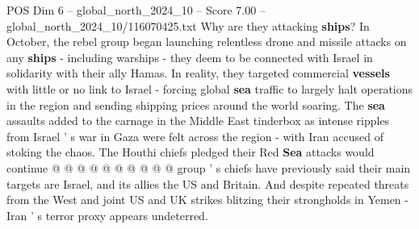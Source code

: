 \begin{textsample}{POS Dim 6 – global\_north\_2024\_10 – Score 7.00 – global\_north\_2024\_10/116070425.txt}
Why are they attacking \textbf{ships}?
In October, the rebel group began launching relentless drone and missile attacks on any \textbf{ships} - including warships - they deem to be connected with Israel in solidarity with their ally Hamas.
In reality, they targeted commercial \textbf{vessels} with little or no link to Israel - forcing global \textbf{sea} traffic to largely halt operations in the region and sending shipping prices around the world soaring.
The \textbf{sea} assaults added to the carnage in the Middle East tinderbox as intense ripples from Israel ' s war in Gaza were felt across the region - with Iran accused of stoking the chaos.
The Houthi chiefs pledged their Red \textbf{Sea} attacks would continue @ @ @ @ @ @ @ @ @ @ group ' s chiefs have previously said their main targets are Israel, and its allies the US and Britain.
And despite repeated threats from the West and joint US and UK strikes blitzing their strongholds in Yemen - Iran ' s terror proxy appears undeterred.

\end{textsample}
